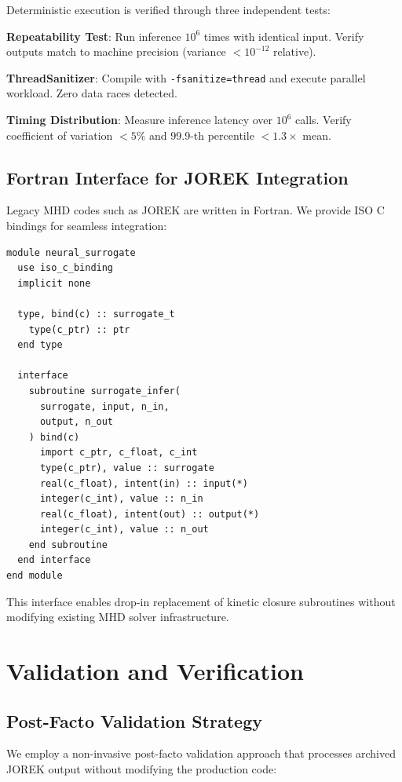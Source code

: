 \documentclass[12pt]{article}
\begin{document}
Deterministic execution is verified through three independent tests:

\textbf{Repeatability Test}: Run inference $10^6$ times with identical input. Verify outputs match to machine precision (variance $< 10^{-12}$ relative).

\textbf{ThreadSanitizer}: Compile with \texttt{-fsanitize=thread} and execute parallel workload. Zero data races detected.

\textbf{Timing Distribution}: Measure inference latency over $10^6$ calls. Verify coefficient of variation $< 5\%$ and 99.9-th percentile $< 1.3\times$ mean.

\subsection{Fortran Interface for JOREK Integration}

Legacy MHD codes such as JOREK are written in Fortran. We provide ISO C bindings for seamless integration:

\begin{verbatim}
module neural_surrogate
  use iso_c_binding
  implicit none
  
  type, bind(c) :: surrogate_t
    type(c_ptr) :: ptr
  end type
  
  interface
    subroutine surrogate_infer(
      surrogate, input, n_in,
      output, n_out
    ) bind(c)
      import c_ptr, c_float, c_int
      type(c_ptr), value :: surrogate
      real(c_float), intent(in) :: input(*)
      integer(c_int), value :: n_in
      real(c_float), intent(out) :: output(*)
      integer(c_int), value :: n_out
    end subroutine
  end interface
end module
\end{verbatim}

This interface enables drop-in replacement of kinetic closure subroutines without modifying existing MHD solver infrastructure.

\section{Validation and Verification}
\label{sec:validation}

\subsection{Post-Facto Validation Strategy}

We employ a non-invasive post-facto validation approach that processes archived JOREK output without modifying the production code:
\end{document}

